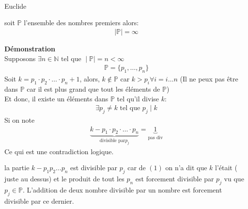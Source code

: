 \begin{parag}{Euclide}
        \begin{theoreme}
           soit $ \mathbb{P}$ l'ensemble des nombres premiers alors:
           \begin{align*}
               \mid \mathbb{P} \mid = \infty
           \end{align*}
        \end{theoreme}
        \textbf{Démonstration} \\
        Supposons $ \exists n \in \mathbb{N} \text{ tel que } \mid \mathbb{P} \mid = n < \infty$ 
        \begin{align*}
        \mathbb{P} = \{ p_1, \dots, p_n\}
        \end{align*}
        Soit $k = p_1  \cdot p_2 \cdot\dots \cdot p_{n} + 1$,  alors, $k \notin \mathbb{P}$ car $k > p_i \forall i = i \dots n$ (Il ne peux pas être dans $ \mathbb{P}$ car il est plus grand que tout les éléments de $ \mathbb{P}$) \\
        Et donc, il existe un éléments dans $ \mathbb{P}$ tel qu'il divise $k$:
        \begin{align*}
            \exists p_j \neq k \text{ tel que } p_j \mid k
        \end{align*}
       Si on note
       \begin{align*}
           \underbrace{k - p_1 \cdot p_2 \cdot \dots \cdot p_n}_{ \text{divisible par} p_j} = \underbrace{1}_{ \text{pas div}}
       \end{align*}
       Ce qui est une contradiction logique.
       \begin{framedremark}
           la partie $k - p_1p_2 \dots p_n$ est divisible par $p_j$ car de $(1)$ on n'a dit que $k$ l'était ( juste au dessus) et le produit de tout les $p_n$ est forcement divisible par $p_j$ vu que $p_j \in \mathbb{P}$. L'addition de deux nombre divisible par un nombre est forcement divisible par ce dernier.
       \end{framedremark}
\end{parag}
      




